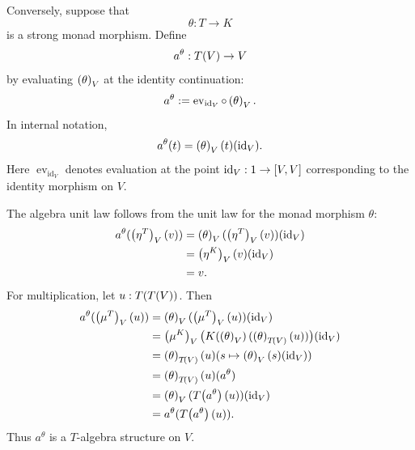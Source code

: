 \documentclass[11pt,a4paper]{article}
\theoremstyle{definition}
\theoremstyle{remark}
\providecommand{\id}{\mathrm{id}}
\begin{document}
Conversely, suppose that
\[
  \theta:T\to K
\]
is a strong monad morphism.  Define
\[
  a^{\theta}:\Fun{T}{V}\to V
\]
by evaluating \(\Nat{\theta}{V}\) at the identity continuation:
\[
  a^{\theta}
  :=
  \operatorname{ev}_{\id_{V}}\circ\Nat{\theta}{V}.
\]
In internal notation,
\[
  a^{\theta}(t)=\Nat{\theta}{V}(t)(\id_{V}).
\]
Here \(\operatorname{ev}_{\id_{V}}\) denotes evaluation at the point
\(\id_{V}:1\to\inthom{V}{V}\) corresponding to the identity morphism on \(V\).

The algebra unit law follows from the unit law for the monad morphism
\(\theta\):
\[
\begin{aligned}
  a^{\theta}(\Nat{\eta^{T}}{V}(v))
  &=
  \Nat{\theta}{V}(\Nat{\eta^{T}}{V}(v))(\id_{V}) \\
  &=
  \Nat{\eta^{K}}{V}(v)(\id_{V})                  \\
  &=
  v.
\end{aligned}
\]
For multiplication, let \(u:\Fun{T}{\Fun{T}{V}}\).  Then
\[
\begin{aligned}
  a^{\theta}(\Nat{\mu^{T}}{V}(u))
  &=
  \Nat{\theta}{V}(\Nat{\mu^{T}}{V}(u))(\id_{V})                       \\
  &=
  \Nat{\mu^{K}}{V}
  \bigl(
    \Fun{K}{\Nat{\theta}{V}}
    (\Nat{\theta}{\Fun{T}{V}}(u))
  \bigr)(\id_{V})                                                     \\
  &=
  \Nat{\theta}{\Fun{T}{V}}(u)
  (s\mapsto \Nat{\theta}{V}(s)(\id_{V}))                              \\
  &=
  \Nat{\theta}{\Fun{T}{V}}(u)(a^{\theta})                             \\
  &=
  \Nat{\theta}{V}(\Fun{T}{a^{\theta}}(u))(\id_{V})                    \\
  &=
  a^{\theta}(\Fun{T}{a^{\theta}}(u)).
\end{aligned}
\]
Thus \(a^{\theta}\) is a \(T\)-algebra structure on \(V\).
\end{document}
